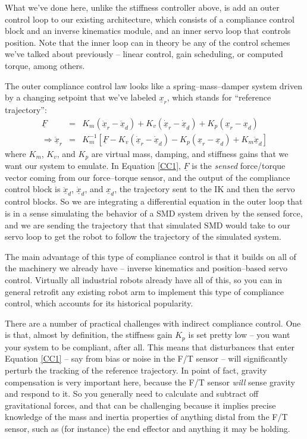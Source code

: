 \documentclass[]{article}
\begin{document}
What we've done here, unlike the stiffness controller above, is add an outer control loop to our existing architecture, which consists of a compliance control block and an inverse kinematics module, and an inner servo loop that controls position. Note that the inner loop can in theory be any of the control schemes we've talked about previously -- linear control, gain scheduling, or computed torque, among others.

The outer compliance control law looks like a spring--mass--damper system driven by a changing setpoint that we've labeled $\underline{x}_{r}$, which stands for ``reference trajectory'':
\begin{eqnarray}
 \underline{F} & = & K_{m}\left(\ddot{\underline{x}}_{r} - \ddot{\underline{x}}_{d}\right) + K_{v}\left(\underline{\dot{x}}_{r} - \underline{\dot{x}}_{d}\right) + K_{p}\left(\underline{x}_{r} - \underline{x}_{d}\right)  \nonumber \\
 \Rightarrow \ddot{\underline{x}}_{r} & = & K_{m}^{-1}\left[\underline{F} - K_{v}\left(\underline{\dot{x}}_{r} - \underline{\dot{x}}_{d}\right) - K_{p}\left(\underline{x}_{r}-\underline{x}_{d}\right) + K_{m}\underline{\ddot{x}}_{d}\right] \label{CC1}
 \end{eqnarray}
where $K_{m}$, $K_{v}$, and $K_{p}$ are virtual mass, damping, and stiffness gains that we want our system to emulate. In Equation \ref{CC1}, $\underline{F}$ is the \textit{sensed} force/torque vector coming from our force--torque sensor, and the output of the compliance control block is $\underline{\ddot{x}}_{d}$, $\underline{\dot{x}}_{d}$, and $\underline{x}_{d}$, the trajectory sent to the IK and then the servo control blocks. So we are integrating a differential equation in the outer loop that is in a sense simulating the behavior of a SMD system driven by the sensed force, and we are sending the trajectory that that simulated SMD would take to our servo loop to get the robot to follow the trajectory of the simulated system.

The main advantage of this type of compliance control is that it builds on all of the machinery we already have -- inverse kinematics and position--based servo control. Virtually all industrial robots already have all of this, so you can in general retrofit any existing robot arm to implement this type of compliance control, which accounts for its historical popularity.

There are a number of practical challenges with indirect compliance control. One is that, almost by definition, the stiffness gain $K_{p}$ is set pretty low -- you want your system to be compliant, after all. This means that disturbances that enter Equation \ref{CC1} -- say from bias or noise in the F/T sensor -- will significantly perturb the tracking of the reference trajectory. In point of fact, gravity compensation is very important here, because the F/T sensor \textit{will} sense gravity and respond to it. So you generally need to calculate and subtract off gravitational forces, and that can be challenging because it implies precise knowledge of the mass and inertia properties of anything distal from the F/T sensor, such as (for instance) the end effector and anything it may be holding.
\end{document}
